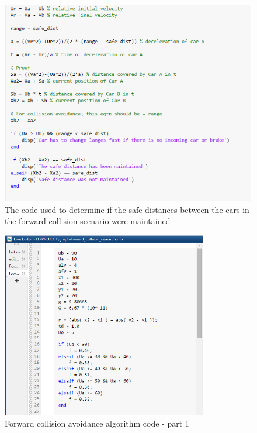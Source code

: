 \documentclass[12pt]{report}
\begin{document}
\begin{figure}[!ht]
	\includegraphics[width=1.0\textwidth]{pretty.png}
	\caption{The code used to determine if the safe distances between the cars in the forward collision scenario were maintained}
	\label{fig}
\end{figure}
\begin{figure}[!ht]
	\includegraphics[width=0.8\textwidth]{xyz.png}
	\caption{Forward collision avoidance algorithm code - part 1 }
	\label{fig}
\end{figure}
\end{document}
